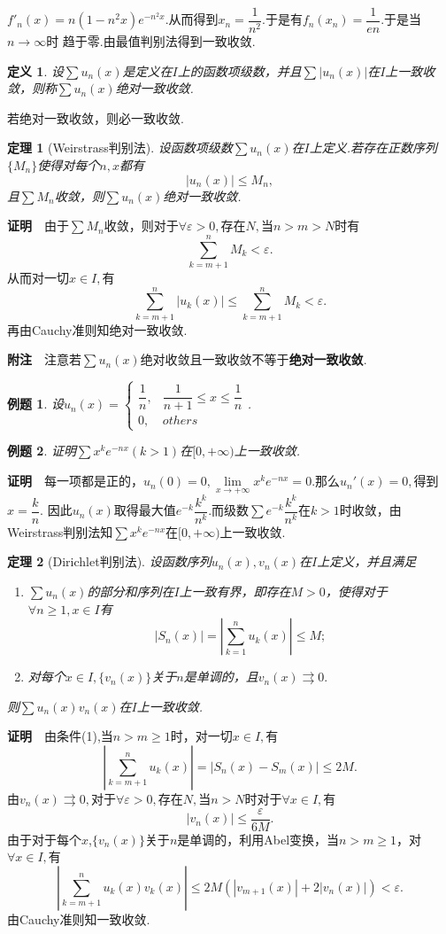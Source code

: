 \documentclass[UTF8]{article}
\newcommand{\zm}{\textbf{证明}$\quad$}
\newcommand{\fz}{\textbf{附注}$\quad$}
\newtheorem{thm}{\hspace{2em}定理}[section]
\newtheorem{dfn}{\hspace{2em}定义}[section]
\newtheorem{exa}{\hspace{2em}例题}[section]
\begin{document}
$f'_n(x)=n(1-n^2x)e^{-n^2x}$.从而得到$x_n=\dfrac{1}{n^2}.$于是有$f_n(x_n)=\dfrac{1}{en}.$于是当$n\to\infty$时
趋于零.由最值判别法得到一致收敛.
\begin{dfn}
  设$\sum u_n(x)$是定义在$I$上的函数项级数，并且$\sum |u_n(x)|$在$I$上一致收敛，则称$\sum u_n(x)$绝对一致收敛.
\end{dfn}
若绝对一致收敛，则必一致收敛.
\begin{thm}[Weirstrass判别法]
  设函数项级数$\sum u_n(x)$在$I$上定义.若存在正数序列$\{M_n\}$使得对每个$n,x$都有
  $$|u_n(x)|\le M_n,$$且$\sum M_n$收敛，则$\sum u_n(x)$绝对一致收敛.
\end{thm}
\zm 由于$\sum M_n$收敛，则对于$\forall\varepsilon>0,$存在$N,$当$n>m>N$时有
$$\sum_{k=m+1}^nM_k<\varepsilon.$$
从而对一切$x\in I,$有
$$\sum_{k=m+1}^n|u_k(x)|\le\sum_{k=m+1}^nM_k<\varepsilon.$$
再由Cauchy准则知绝对一致收敛.

\fz 注意若$\sum u_n(x)$绝对收敛且一致收敛不等于\textbf{绝对一致收敛}.
\begin{exa}
  设$u_n(x)=\begin{cases}\dfrac{1}{n},&\dfrac{1}{n+1}\le x\le\dfrac{1}{n}\\0,&others\end{cases}$.
\end{exa}
\begin{exa}
  证明$\sum x^ke^{-nx}(k>1)$在$[0,+\infty)$上一致收敛.
\end{exa}
\zm 每一项都是正的，$u_n(0)=0,\lim\limits_{x\to+\infty}x^ke^{-nx}=0.$那么$u_n'(x)=0,$得到$x=\dfrac{k}{n}.$
因此$u_n(x)$取得最大值$e^{-k}\dfrac{k^k}{n^k}.$而级数$\sum e^{-k}\dfrac{k^k}{n^k}$在$k>1$时收敛，由
Weirstrass判别法知$\sum x^ke^{-nx}$在$[0,+\infty)$上一致收敛.
\begin{thm}[Dirichlet判别法]
  设函数序列$u_n(x),v_n(x)$在$I$上定义，并且满足
  \begin{enumerate}
    \item $\sum u_n(x)$的部分和序列在$I$上一致有界，即存在$M>0$，使得对于$\forall n\ge1,x\in I$有
    $$|S_n(x)|=|\sum_{k=1}^nu_k(x)|\le M;$$
    \item 对每个$x\in I,\{v_n(x)\}$关于$n$是单调的，且$v_n(x)\rightrightarrows 0.$
  \end{enumerate}
  则$\sum u_n(x)v_n(x)$在$I$上一致收敛.
\end{thm}
\zm 由条件(1),当$n>m\ge 1$时，对一切$x\in I,$有
$$\left|\sum_{k=m+1}^nu_k(x)\right|=|S_n(x)-S_m(x)|\le 2M.$$
由$v_n(x)\rightrightarrows 0,$对于$\forall\varepsilon>0,$存在$N,$当$n>N$时对于$\forall x\in I,$有
$$|v_n(x)|\le\frac{\varepsilon}{6M}.$$
由于对于每个$x$,$\{v_n(x)\}$关于$n$是单调的，利用Abel变换，当$n>m\ge 1$，对$\forall x\in I,$有
$$\left|\sum_{k=m+1}^nu_k(x)v_k(x)\right|\le 2M(|v_{m+1}(x)|+2|v_n(x)|)<\varepsilon.$$
由Cauchy准则知一致收敛.
\clearpage
\end{document}
